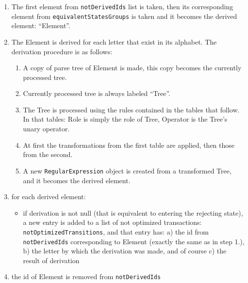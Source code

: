 \documentclass{article}
\begin{document}
\begin{enumerate}

  \item The first element from \verb|notDerivedIds| list is taken, then its corresponding element from
  \verb|equivalentStatesGroups| is taken and it becomes the derived element: ``Element''.

  \item The Element is derived for each letter that exist in its alphabet. The derivation procedure
  is as follows:
  
  \begin{enumerate}

    \item A copy of parse tree of Element is made, this copy becomes the currently processed tree.

    \item Currently processed tree is always labeled ``Tree''.

    \item The Tree is processed using the rules contained in the tables that follow. In that tables:
    Role is simply the role of Tree, Operator is the Tree's unary operator.
    
    \item At first the transformations from the first table are applied, then those from the second.

    \item A new \verb|RegularExpression| object is created from a transformed Tree, and it
    becomes the derived element.

  \end{enumerate}

  \item for each derived element:

  \begin{itemize}

    \item if derivation is not null (that is equivalent to entering the rejecting state), a new
    entry is added to a list of not optimized transactions: \verb|notOptimizedTransitions|, and that
    entry has: a) the id from \verb|notDerivedIds| corresponding to Element (exactly the same as in
    step 1.), b) the letter by which the derivation was made, and of course c) the result of
    derivation

  \end{itemize}

  \item the id of Element is removed from \verb|notDerivedIds|

\end{enumerate}
\end{document}
